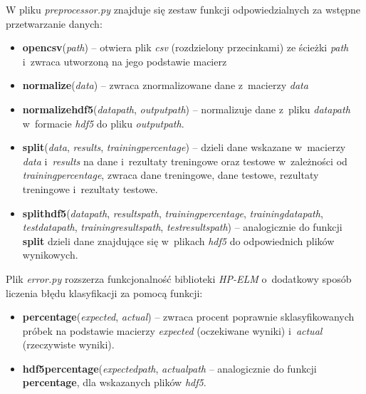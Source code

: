 \documentclass[pl]{minipw} %
\begin{document}
W pliku \textit{preprocessor.py} znajduje się zestaw funkcji odpowiedzialnych za wstępne przetwarzanie danych:
\begin{itemize}
\item \textbf{open\textunderscore csv}(\textit{path}) -- otwiera plik \textit{csv} (rozdzielony przecinkami) ze ścieżki \textit{path} i~zwraca utworzoną na jego podstawie macierz
\item \textbf{normalize}(\textit{data}) -- zwraca znormalizowane dane z~macierzy \textit{data}
\item \textbf{normalize\textunderscore hdf5}(\textit{data\textunderscore path}, \textit{output\textunderscore path}) -- normalizuje dane z~pliku \textit{data\textunderscore path} w~formacie \textit{hdf5} do pliku \textit{output\textunderscore path}.
\item \textbf{split}(\textit{data}, \textit{results}, \textit{training\textunderscore percentage}) -- dzieli dane wskazane w~macierzy \textit{data} i~\textit{results} na dane i~rezultaty treningowe oraz testowe w~zależności od \textit{training\textunderscore percentage}, zwraca dane treningowe, dane testowe, rezultaty treningowe i~rezultaty testowe.
\item \textbf{split\textunderscore hdf5}(\textit{data\textunderscore path}, \textit{results\textunderscore path}, \textit{training\textunderscore percentage}, \textit{training\textunderscore data\textunderscore path}, \textit{test\textunderscore data\textunderscore path}, \textit{training\textunderscore results\textunderscore path}, \textit{test\textunderscore results\textunderscore path}) -- analogicznie do funkcji \textbf{split} dzieli dane znajdujące się w~plikach \textit{hdf5} do odpowiednich plików wynikowych.
\end{itemize}
Plik \textit{error.py} rozszerza funkcjonalność biblioteki \textit{HP-ELM} o~dodatkowy sposób liczenia błędu klasyfikacji za pomocą funkcji:
\begin{itemize}
\item \textbf{percentage}(\textit{expected}, \textit{actual}) -- zwraca procent poprawnie sklasyfikowanych próbek na podstawie macierzy \textit{expected} (oczekiwane wyniki) i~\textit{actual} (rzeczywiste wyniki).
\item \textbf{hdf5\textunderscore percentage}(\textit{expected\textunderscore path}, \textit{actual\textunderscore path} -- analogicznie do funkcji \textbf{percentage}, dla wskazanych plików \textit{hdf5}.
\end{itemize}
\end{document}
